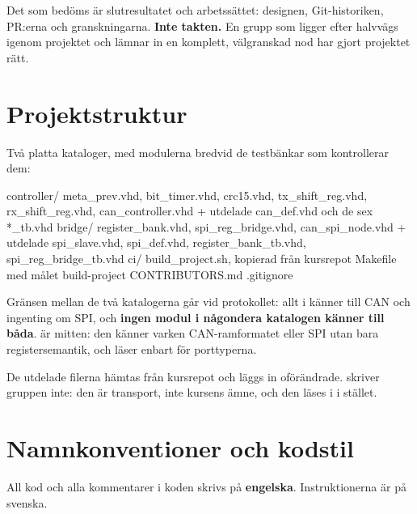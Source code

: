 Det som bedöms är slutresultatet och arbetssättet: designen, Git-historiken, PR:erna och
granskningarna. \textbf{Inte takten.} En grupp som ligger efter halvvägs igenom projektet och lämnar
in en komplett, välgranskad nod har gjort projektet rätt.

\section{Projektstruktur}
\label{app:project:layout}

Två platta kataloger, med modulerna bredvid de testbänkar som kontrollerar dem:

\begin{textdrawing}
controller/   meta_prev.vhd, bit_timer.vhd, crc15.vhd,
              tx_shift_reg.vhd, rx_shift_reg.vhd, can_controller.vhd
              + utdelade can_def.vhd och de sex *_tb.vhd
bridge/       register_bank.vhd, spi_reg_bridge.vhd, can_spi_node.vhd
              + utdelade spi_slave.vhd, spi_def.vhd,
                register_bank_tb.vhd, spi_reg_bridge_tb.vhd
ci/           build_project.sh, kopierad från kursrepot
Makefile      med målet build-project
CONTRIBUTORS.md
.gitignore
\end{textdrawing}

Gränsen mellan de två katalogerna går vid protokollet: allt i  känner till CAN och
ingenting om SPI, och \textbf{ingen modul i någondera katalogen känner till båda}.
 är mitten: den känner varken CAN-ramformatet eller SPI utan bara
registersemantik, och läser  enbart för porttyperna.

De utdelade filerna hämtas från kursrepot och läggs in oförändrade.  skriver
gruppen inte: den är transport, inte kursens ämne, och den läses i  i stället.

\section{Namnkonventioner och kodstil}
\label{app:project:style}

All kod och alla kommentarer i koden skrivs på \textbf{engelska}. Instruktionerna är på svenska.

